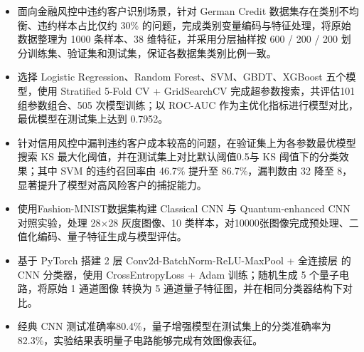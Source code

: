 \documentclass{resume}
\begin{document}
\begin{itemize}

  \item 面向金融风控中违约客户识别场景，针对 German Credit 数据集存在类别不均衡、违约样本占比仅约 30\% 的问题，完成类别变量编码与特征处理，将原始数据整理为 1000 条样本、38 维特征，并采用分层抽样按 600 / 200 / 200 划分训练集、验证集和测试集，保证各数据集类别比例一致。

  \item 选择 Logistic Regression、Random Forest、SVM、GBDT、XGBoost 五个模型，使用 Stratified 5-Fold CV + GridSearchCV 完成超参数搜索，共评估101 组参数组合、505 次模型训练；以 ROC-AUC 作为主优化指标进行模型对比，最优模型在测试集上达到 0.7952。

  \item 针对信用风控中漏判违约客户成本较高的问题，在验证集上为各参数最优模型搜索 KS 最大化阈值，并在测试集上对比默认阈值0.5与 KS 阈值下的分类效果；其中 SVM 的违约召回率由 46.7\% 提升至 86.7\%，漏判数由 32 降至 8，显著提升了模型对高风险客户的捕捉能力。

\end{itemize}
    

\begin{itemize}

  \item 使用Fashion-MNIST数据集构建 Classical CNN 与 Quantum-enhanced CNN 对照实验，处理 28$\times$28 灰度图像、10 类样本，对10000张图像完成预处理、二值化编码、量子特征生成与模型评估。

  \item 基于 PyTorch 搭建 2 层 Conv2d-BatchNorm-ReLU-MaxPool + 全连接层 的 CNN 分类器，使用 CrossEntropyLoss + Adam 训练；随机生成 5 个量子电路，将原始 1 通道图像 转换为 5 通道量子特征图，并在相同分类器结构下对比。

  \item 经典 CNN 测试准确率80.4\%，量子增强模型在测试集上的分类准确率为82.3\%，实验结果表明量子电路能够完成有效图像表征。
  
\end{itemize}


\end{document}
